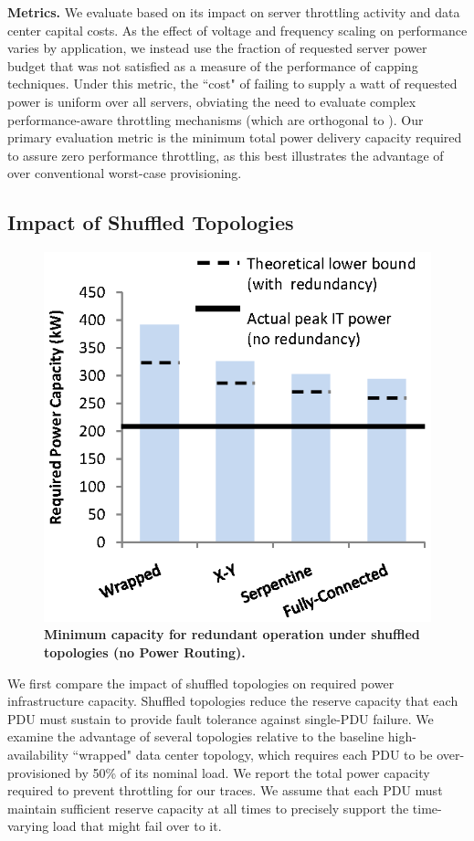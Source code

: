 {\bf Metrics.} We evaluate \PowerRouting based on its impact on server throttling activity and data center capital costs.  As the effect of voltage and frequency scaling on performance varies by application, we instead use the fraction of requested server power budget that was not satisfied as a measure of the performance of capping techniques.  Under this metric, the ``cost" of failing to supply a watt of requested power is uniform over all servers, obviating the need to evaluate complex performance-aware throttling mechanisms (which are orthogonal to \PowerRouting). Our primary evaluation metric is the minimum total power delivery capacity required to assure zero performance throttling, as this best illustrates the advantage of \PowerRouting over conventional worst-case provisioning.

\subsection{Impact of Shuffled Topologies}

\begin{figure}[t!]
\centering
\includegraphics[width = 3.0 in]{Appendices/PowerRouting/figure/result_intermix.eps}
\caption{ \textbf{Minimum capacity for redundant operation under shuffled topologies (no Power Routing).} }
\label{figure::intermix}
\vspace{-.1 in}
\end{figure}

We first compare the impact of shuffled topologies on required power infrastructure capacity.  Shuffled topologies reduce the reserve capacity that each PDU must sustain to provide fault tolerance against single-PDU failure.  We examine the advantage of several topologies relative to the baseline high-availability ``wrapped" data center topology, which requires each PDU to be over-provisioned by 50\% of its nominal load.  We report the total power capacity required to prevent throttling for our traces.  We assume that each PDU must maintain sufficient reserve capacity at all times to precisely support the time-varying load that might fail over to it.

